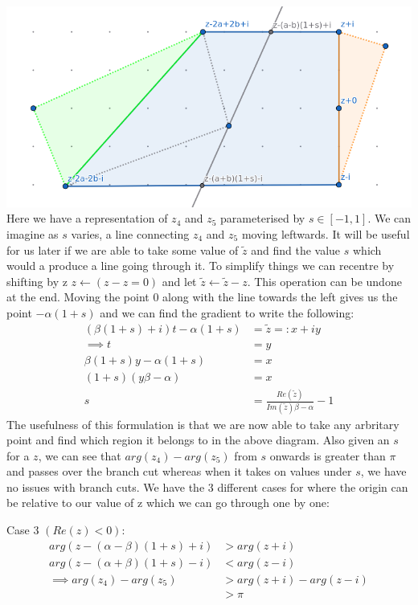 \documentclass{article}
\begin{document}
\includegraphics[width=\textwidth]{z45}
Here we have a representation of $z_4$ and $z_5$ parameterised by $s\in[-1,1]$.
We can imagine as $s$ varies, a line connecting $z_4$ and $z_5$ moving leftwards.
It will be useful for us later if we are able to take some value of $\tilde{z}$ and find the value $s$ which would a produce a line going through it.
To simplify things we can recentre by shifting by z $z \leftarrow (z-z=0)$ and let $\tilde{z} \leftarrow \tilde{z}-z$.
This operation can be undone at the end.
Moving the point $0$ along with the line towards the left gives us the point $-\alpha(1+s)$ and we can find the gradient to write the following:
\begin{align}
    (\beta(1+s)+i)t-\alpha(1+s)&=\tilde{z}=:x+iy\\
    \implies t&=y\\
    \beta(1+s)y-\alpha(1+s)&=x\\
    (1+s)(y\beta-\alpha)&=x\\
    s&=\frac{Re(\tilde{z})}{Im(\tilde{z})\beta-\alpha}-1
\end{align}
The usefulness of this formulation is that we are now able to take any arbritary point and find which region it belongs to in the above diagram.
Also given an $s$ for a $z$, we can see that $arg(z_4)-arg(z_5)$ from $s$ onwards is greater than $\pi$ and passes over the branch cut whereas when it takes on values under $s$, we have no issues with branch cuts.
We have the 3 different cases for where the origin can be relative to our value of z which we can go through one by one:

Case 3 $(Re(z)<0)$:
\begin{align}
    arg(z-(\alpha-\beta)(1+s)+i)&>arg(z+i)\\
    arg(z-(\alpha+\beta)(1+s)-i)&<arg(z-i)\\
    \implies arg(z_4)-arg(z_5)&>arg(z+i)-arg(z-i)\\
    &>\pi
\end{align}
\end{document}
